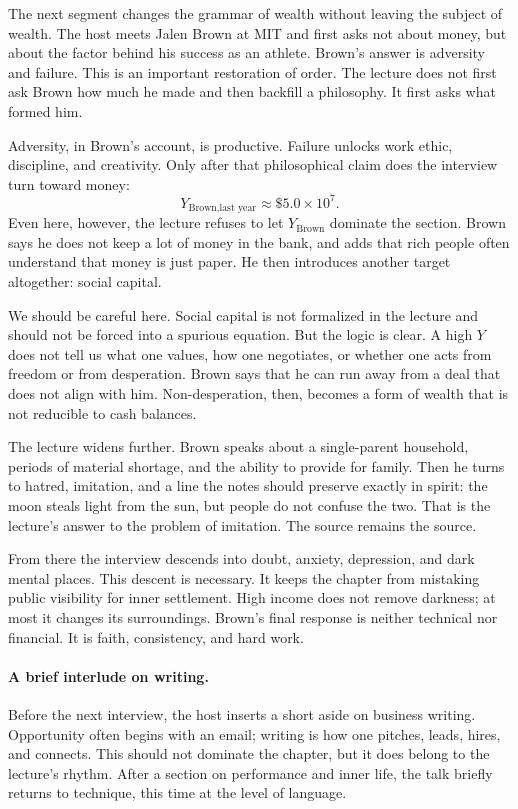 The next segment changes the grammar of wealth without leaving the subject of wealth. The host meets Jalen Brown at MIT and first asks not about money, but about the factor behind his success as an athlete. Brown's answer is adversity and failure. This is an important restoration of order. The lecture does not first ask Brown how much he made and then backfill a philosophy. It first asks what formed him.

Adversity, in Brown's account, is productive. Failure unlocks work ethic, discipline, and creativity. Only after that philosophical claim does the interview turn toward money:
\begin{equation}
Y_{\text{Brown,last year}} \approx \$5.0 \times 10^7.
\end{equation}
Even here, however, the lecture refuses to let \(Y_{\text{Brown}}\) dominate the section. Brown says he does not keep a lot of money in the bank, and adds that rich people often understand that money is just paper. He then introduces another target altogether: social capital.

We should be careful here. Social capital is not formalized in the lecture and should not be forced into a spurious equation. But the logic is clear. A high \(Y\) does not tell us what one values, how one negotiates, or whether one acts from freedom or from desperation. Brown says that he can run away from a deal that does not align with him. Non-desperation, then, becomes a form of wealth that is not reducible to cash balances.

The lecture widens further. Brown speaks about a single-parent household, periods of material shortage, and the ability to provide for family. Then he turns to hatred, imitation, and a line the notes should preserve exactly in spirit: the moon steals light from the sun, but people do not confuse the two. That is the lecture's answer to the problem of imitation. The source remains the source.

From there the interview descends into doubt, anxiety, depression, and dark mental places. This descent is necessary. It keeps the chapter from mistaking public visibility for inner settlement. High income does not remove darkness; at most it changes its surroundings. Brown's final response is neither technical nor financial. It is faith, consistency, and hard work.

\paragraph{A brief interlude on writing.} Before the next interview, the host inserts a short aside on business writing. Opportunity often begins with an email; writing is how one pitches, leads, hires, and connects. This should not dominate the chapter, but it does belong to the lecture's rhythm. After a section on performance and inner life, the talk briefly returns to technique, this time at the level of language.

